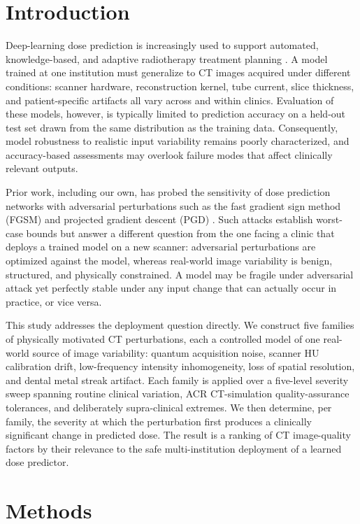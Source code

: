 \documentclass[11pt]{article}
\begin{document}
\section{Introduction}

Deep-learning dose prediction is increasingly used to support automated,
knowledge-based, and adaptive radiotherapy treatment planning
\citep{babier2021openkbp}. A model trained at one institution must generalize
to CT images acquired under different conditions: scanner hardware,
reconstruction kernel, tube current, slice thickness, and patient-specific
artifacts all vary across and within clinics. Evaluation of these models,
however, is typically limited to prediction accuracy on a held-out test set
drawn from the same distribution as the training data. Consequently, model
robustness to realistic input variability remains poorly characterized, and
accuracy-based assessments may overlook failure modes that affect clinically
relevant outputs.

Prior work, including our own, has probed the sensitivity of dose prediction
networks with adversarial perturbations such as the fast gradient sign method
(FGSM) and projected gradient descent (PGD) \citep{goodfellow2015fgsm}. Such
attacks establish worst-case bounds but answer a different question from the
one facing a clinic that deploys a trained model on a new scanner: adversarial
perturbations are optimized against the model, whereas real-world image
variability is benign, structured, and physically constrained. A model may be
fragile under adversarial attack yet perfectly stable under any input change
that can actually occur in practice, or vice versa.

This study addresses the deployment question directly. We construct five
families of physically motivated CT perturbations, each a controlled model of
one real-world source of image variability: quantum acquisition noise,
scanner HU calibration drift, low-frequency intensity inhomogeneity, loss of
spatial resolution, and dental metal streak artifact. Each family is applied
over a five-level severity sweep spanning routine clinical variation, ACR
CT-simulation quality-assurance tolerances, and deliberately supra-clinical
extremes. We then determine, per family, the severity at which the perturbation
first produces a clinically significant change in predicted dose. The result is
a ranking of CT image-quality factors by their relevance to the safe
multi-institution deployment of a learned dose predictor.

\section{Methods}
\end{document}
